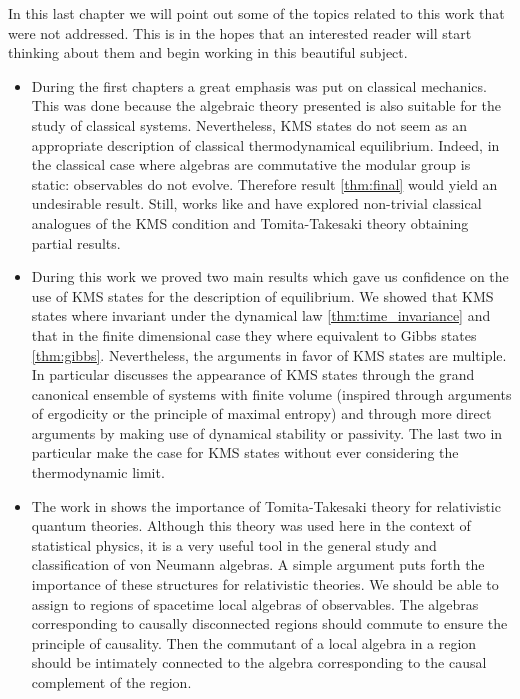 In this last chapter we will point out some of the topics related to this work that were not addressed. This is in the hopes that an interested reader will start thinking about them and begin working in this beautiful subject.

\begin{itemize}

\item During the first chapters a great emphasis was put on classical mechanics. This was done because the algebraic theory presented is also suitable for the study of classical systems. Nevertheless, KMS states do not seem as an appropriate description of classical thermodynamical equilibrium. Indeed, in the classical case where algebras are commutative the modular group is static: observables do not evolve. Therefore result \ref{thm:final} would yield an undesirable result. Still, works like \cite{Aizenman1977} and \cite{Gallavotti1976} have explored non-trivial classical analogues of the KMS condition and Tomita-Takesaki theory obtaining partial results.

\item During this work we proved two main results which gave us confidence on the use of KMS states for the description of equilibrium. We showed that KMS states where invariant under the dynamical law \ref{thm:time_invariance} and that in the finite dimensional case they where equivalent to Gibbs states \ref{thm:gibbs}. Nevertheless, the arguments in favor of KMS states are multiple. In particular \cite{Haag1992} discusses the appearance of KMS states through the grand canonical ensemble of systems with finite volume (inspired through arguments of ergodicity or the principle of maximal entropy) and through more direct arguments by making use of dynamical stability or passivity. The last two in particular make the case for KMS states without ever considering the thermodynamic limit.

\item The work in \cite{Haag1992} shows the importance of Tomita-Takesaki theory for relativistic quantum theories. Although this theory was used here in the context of statistical physics, it is a very useful tool in the general study and classification of von Neumann algebras. A simple argument puts forth the importance of these structures for relativistic theories. We should be able to assign to regions of spacetime local algebras of observables. The algebras corresponding to causally disconnected regions should commute to ensure the principle of causality. Then the commutant of a local algebra in a region should be intimately connected to the algebra corresponding to the causal complement of the region. 


\end{itemize}
